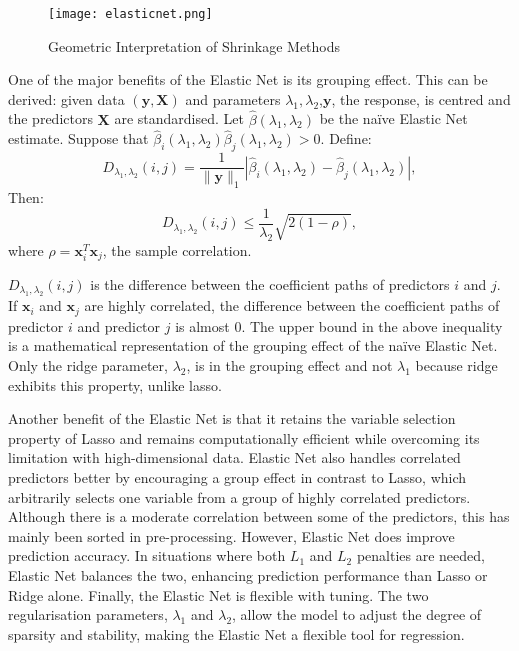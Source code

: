 \begin{figure}[H]
    \centering
    \texttt{[image: elasticnet.png]}
    \caption{Geometric Interpretation of Shrinkage Methods  \cite{cfi2024elasticnet}}
    \label{fig:elasticnet}
\end{figure}

\noindent One of the major benefits of the Elastic Net is its grouping effect. This can be derived: 
given data \((\mathbf{y}, \mathbf{X})\) and parameters \(\lambda_1, \lambda_2\),\(\mathbf{y}\), the response, is centred and the predictors \(\mathbf{X}\) are standardised.\cite{elasticnet} Let \(\hat{\beta}(\lambda_1, \lambda_2)\) be the naïve Elastic Net estimate. Suppose that \(\hat{\beta}_i(\lambda_1, \lambda_2) \hat{\beta}_j(\lambda_1, \lambda_2) > 0\). Define:
\[
D_{\lambda_1, \lambda_2}(i, j) = \frac{1}{\|\mathbf{y}\|_1} \left| \hat{\beta}_i(\lambda_1, \lambda_2) - \hat{\beta}_j(\lambda_1, \lambda_2) \right|,
\]
Then:
\[
D_{\lambda_1, \lambda_2}(i, j) \leq \frac{1}{\lambda_2} \sqrt{2(1 - \rho)},
\]
where \(\rho = \mathbf{x}_i^T \mathbf{x}_j\), the sample correlation.

\noindent \(D_{\lambda_1, \lambda_2}(i, j)\) is the difference between the coefficient paths of predictors \(i\) and \(j\).\cite{elasticnet} If \(\mathbf{x}_i\) and \(\mathbf{x}_j\) are highly correlated, the difference between the coefficient paths of predictor \(i\) and predictor \(j\) is almost 0.\cite{elasticnet} The upper bound in the above inequality is a mathematical representation of the grouping effect of the naïve Elastic Net. Only the ridge parameter, $\lambda_2$, is in the grouping effect and not $\lambda_1$ because ridge exhibits this property, unlike lasso.


Another benefit of the Elastic Net is that it retains the variable selection property of Lasso and remains computationally efficient while overcoming its limitation with high-dimensional data.\cite{elasticnet} Elastic Net also handles correlated predictors better by encouraging a group effect in contrast to Lasso, which arbitrarily selects one variable from a group of highly correlated predictors.\cite{elasticnet} Although there is a moderate correlation between some of the predictors, this has mainly been sorted in pre-processing. However, Elastic Net does improve prediction accuracy. In situations where both $L_1$ and $L_2$ penalties are needed, Elastic Net balances the two, enhancing prediction performance than Lasso or Ridge alone.\cite{elasticnet} Finally, the Elastic Net is flexible with tuning. The two regularisation parameters, $\lambda_1$ and $\lambda_2$, allow the model to adjust the degree of sparsity and stability, making the Elastic Net a flexible tool for regression.\cite{elasticnet}

